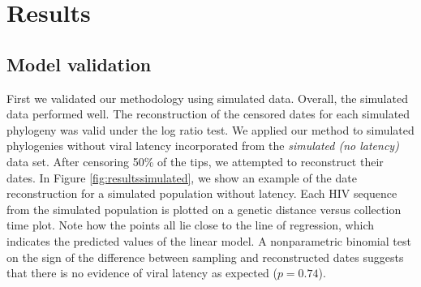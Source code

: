 \documentclass{bmcart}
\begin{document}



\section * {Results} \label{sec:results}


\subsection * {Model validation} \label{sec:simresults}
First we validated our methodology using simulated data.
Overall, the simulated data performed well. The reconstruction of the censored dates for each simulated phylogeny was valid under the log ratio test.
We applied our method to simulated phylogenies without viral latency incorporated from the \emph{simulated (no latency)} data set.
After censoring 50\% of the tips, we attempted to reconstruct their dates.
In Figure \ref{fig:resultssimulated}, we show an example of the date reconstruction for a simulated population without latency.
Each HIV sequence from the simulated population is plotted on a genetic distance versus collection time plot.
Note how the points all lie close to the line of regression, which indicates the predicted values of the linear model.
A nonparametric binomial test on the sign of the difference between sampling and reconstructed dates suggests that there is no evidence of viral latency as expected ($p = 0.74$).
\end{document}
